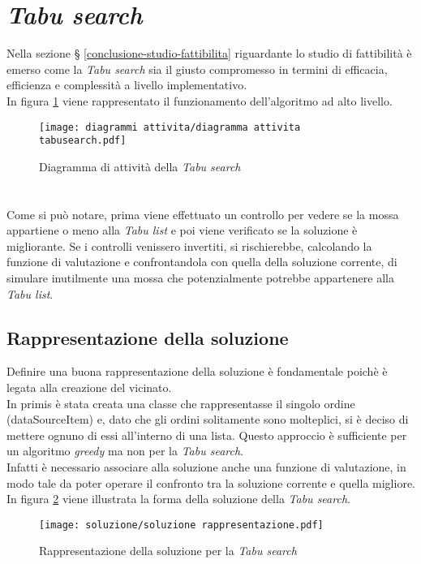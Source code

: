 \section{\textit{Tabu search}}
\label{sec:tabu-search}
\noindent Nella sezione § \ref{conclusione-studio-fattibilita}
riguardante lo studio di fattibilità è emerso come la \textit{Tabu search}
sia il giusto compromesso in termini di efficacia, efficienza
e complessità a livello implementativo.\\
In figura \ref{diagramma-attivita-tabu-search}
viene rappresentato il funzionamento dell'algoritmo ad alto livello.
\vspace*{\fill}
\begin{figure}[!h] 
    \centering 
    \texttt{[image: diagrammi attivita/diagramma attivita tabusearch.pdf]} 
    \caption{Diagramma di attività della \textit{Tabu search}}
    \label{diagramma-attivita-tabu-search}
\end{figure}
\noindent \paragraph{}\hfill\\
Come si può notare, prima viene effettuato un controllo per vedere se la mossa
appartiene o meno alla \textit{Tabu list} e poi viene verificato se la soluzione è migliorante.
Se i controlli venissero invertiti, si rischierebbe, calcolando
la funzione di valutazione e confrontandola con quella della soluzione corrente,
di simulare inutilmente una mossa che potenzialmente potrebbe appartenere alla \textit{Tabu list}.
\vspace*{\fill}

\newpage

\subsection{Rappresentazione della soluzione}
\label{sec:rappresentazione-della-soluzione}
\noindent Definire una buona rappresentazione della soluzione è fondamentale
poichè è legata alla creazione del vicinato.\\
In primis è stata creata una classe che rappresentasse
il singolo ordine (dataSourceItem) e, dato che gli ordini solitamente sono molteplici,
si è deciso di mettere ognuno di essi all'interno di una lista.
Questo approccio è sufficiente per un algoritmo \textit{greedy} ma non per la \textit{Tabu search}.\\
Infatti è necessario associare alla soluzione anche una funzione di valutazione, in modo tale
da poter operare il confronto tra la soluzione corrente e quella migliore.\\
In figura \ref{rappresentazione-soluzione} viene illustrata la forma della soluzione della \textit{Tabu search}.
\begin{figure}[!h] 
    \centering 
    \texttt{[image: soluzione/soluzione rappresentazione.pdf]} 
    \caption{Rappresentazione della soluzione per la \textit{Tabu search}}
    \label{rappresentazione-soluzione}
\end{figure}

